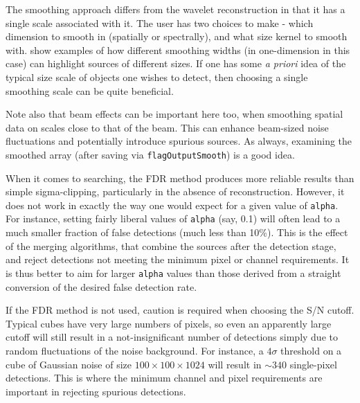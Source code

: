 
The smoothing approach differs from the wavelet reconstruction in that
it has a single scale associated with it. The user has two choices to
make - which dimension to smooth in (spatially or spectrally), and
what size kernel to smooth with. \citet{whiting12} show examples of
how different smoothing widths (in one-dimension in this case) can
highlight sources of different sizes. If one has some \textit{a
  priori} idea of the typical size scale of objects one wishes to
detect, then choosing a single smoothing scale can be quite
beneficial.

Note also that beam effects can be important here too, when smoothing
spatial data on scales close to that of the beam. This can enhance
beam-sized noise fluctuations and potentially introduce spurious
sources. As always, examining the smoothed array (after saving via
\texttt{flagOutputSmooth}) is a good idea.



When it comes to searching, the FDR method produces more reliable
results than simple sigma-clipping, particularly in the absence of
reconstruction.  However, it does not work in exactly the way one
would expect for a given value of \texttt{alpha}. For instance,
setting fairly liberal values of \texttt{alpha} (say, 0.1) will often
lead to a much smaller fraction of false detections (\ie much less
than 10\%). This is the effect of the merging algorithms, that combine
the sources after the detection stage, and reject detections not
meeting the minimum pixel or channel requirements.  It is thus better
to aim for larger \texttt{alpha} values than those derived from a
straight conversion of the desired false detection rate.

If the FDR method is not used, caution is required when choosing the
S/N cutoff. Typical cubes have very large numbers of pixels, so even
an apparently large cutoff will still result in a not-insignificant
number of detections simply due to random fluctuations of the noise
background. For instance, a $4\sigma$ threshold on a cube of Gaussian
noise of size $100\times100\times1024$ will result in $\sim340$
single-pixel detections. This is where the minimum channel and pixel
requirements are important in rejecting spurious detections.


